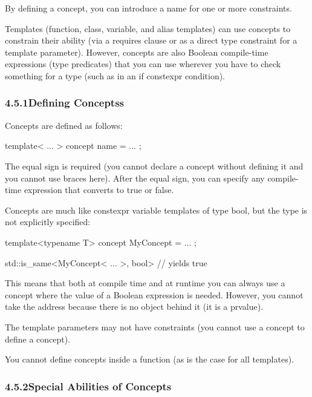 
By defining a concept, you can introduce a name for one or more constraints.

Templates (function, class, variable, and alias templates) can use concepts to constrain their ability (via a requires clause or as a direct type constraint for a template parameter). However, concepts are also Boolean compile-time expressions (type predicates) that you can use wherever you have to check something for a type (such as in an if constexpr condition).


\subsubsection*{ 4.5.1\hspace{0.2cm}Defining Conceptss}

Concepts are defined as follows:

\begin{cpp}
template< ... >
concept name = ... ;
\end{cpp}

The equal sign is required (you cannot declare a concept without defining it and you cannot use braces here).
After the equal sign, you can specify any compile-time expression that converts to true or false.

Concepts are much like constexpr variable templates of type bool, but the type is not explicitly specified:

\begin{cpp}
template<typename T>
concept MyConcept = ... ;

std::is_same<MyConcept< ... >, bool> // yields true
\end{cpp}

This means that both at compile time and at runtime you can always use a concept where the value of a Boolean expression is needed. However, you cannot take the address because there is no object behind it (it is a prvalue).

The template parameters may not have constraints (you cannot use a concept to define a concept).

You cannot define concepts inside a function (as is the case for all templates).

\subsubsection*{ 4.5.2\hspace{0.2cm}Special Abilities of Concepts}

